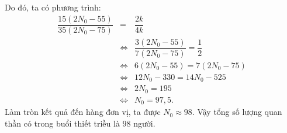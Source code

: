 \begin{ex}
{		Do đó, ta có phương trình:
		\begin{eqnarray*}
			\dfrac{15(2N_0 - 55)}{35(2N_0 - 75)} &=& \dfrac{2k}{4k} \\
			&\Leftrightarrow& \dfrac{3(2N_0 - 55)}{7(2N_0 - 75)} = \dfrac{1}{2} \\
			&\Leftrightarrow& 6(2N_0 - 55) = 7(2N_0 - 75) \\
			&\Leftrightarrow& 12N_0 - 330 = 14N_0 - 525 \\
			&\Leftrightarrow& 2N_0 = 195 \\
			&\Leftrightarrow& N_0 = 97{,}5.
		\end{eqnarray*}
		Làm tròn kết quả đến hàng đơn vị, ta được $N_0 \approx 98$.
		Vậy tổng số lượng quan thần có trong buổi thiết triều là $98$ người.
	}
\end{ex}

